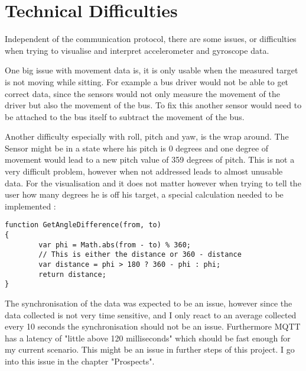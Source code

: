 \section{Technical Difficulties}

Independent of the communication protocol, there are some issues, or difficulties when trying to visualise and interpret accelerometer and gyroscope data.  

One big issue with movement data is, it is only usable when the measured target is not moving while sitting. For example a bus driver would not be able to get correct data, since the sensors would not only measure the movement of the driver but also the movement of the bus. To fix this another sensor would need to be attached to the bus itself to subtract the movement of the bus. 

Another difficulty especially with roll, pitch and yaw, is the wrap around. The Sensor might be in a state where his pitch is 0 degrees and one degree of movement would lead to a new pitch value of 359 degrees of pitch. This is not a very difficult problem, however when not addressed leads to almost unusable data. 
For the visualisation and it does not matter however when trying to tell the user how many degrees he is off his target, a special calculation needed to be implemented \cite{javaHowd16:online}:

\begin{lstlisting}
function GetAngleDifference(from, to)
{
        var phi = Math.abs(from - to) % 360;
        // This is either the distance or 360 - distance
        var distance = phi > 180 ? 360 - phi : phi;
        return distance;
}
\end{lstlisting}
\cite{javaHowd79:online}

The synchronisation of the data was expected to be an issue, however since the data collected is not very time sensitive, and I only react to an average collected every 10 seconds the synchronisation should not be an issue. Furthermore MQTT has a latency of "little above 120 milliseconds" \cite{Measurin4:online} which should be fast enough for my current scenario. This might be an issue in further steps of this project. I go into this issue in the chapter "Prospects".